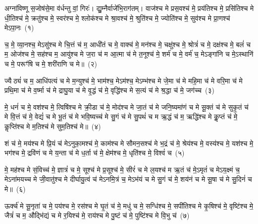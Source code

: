 
{\anuvakamend[{घा॒सिं कश॑या तपद्र॒यिं नव॑ च}]}%

\setcounter{anuvakam}{0}
अग्ना॑विष्णू स॒जोष॑से॒मा व॑र्धन्तु वां॒ गिरः॑। द्यु॒म्नैर्वाजे॑भि॒राग॑तम्। वाज॑श्च मे प्रस॒वश्च॑ मे॒ प्रय॑तिश्च मे॒ प्रसि॑तिश्च मे धी॒तिश्च॑ मे॒ क्रतु॑श्च मे॒ स्वर॑श्च मे॒ श्लोक॑श्च मे श्रा॒वश्च॑ मे॒ श्रुति॑श्च मे॒ ज्योति॑श्च मे॒ सुव॑श्च मे प्रा॒णश्च॑ मे\-ऽपा॒नः~(१)

च॒ मे॒ व्या॒नश्च॒ मे\-ऽसु॑श्च मे चि॒त्तं च॑ म॒ आधी॑तं च मे॒ वाक्च॑ मे॒ मन॑श्च मे॒ चक्षु॑श्च मे॒ श्रोत्रं॑ च मे॒ दक्ष॑श्च मे॒ बलं॑ च म॒ ओज॑श्च मे॒ सह॑श्च म॒ आयु॑श्च मे ज॒रा च॑ म आ॒त्मा च॑ मे त॒नूश्च॑ मे॒ शर्म॑ च मे॒ वर्म॑ च॒ मे\-ऽङ्गा॑नि च मे॒\-ऽस्थानि॑ च मे॒ परूꣳ॑षि च मे॒ शरी॑राणि च मे॥~(२)

{\anuvakamend[{अ॒पा॒नस्त॒नूश्च॑ मे॒\-ऽष्टाद॑श च}]}%

ज्यैठ्यं॑ च म॒ आधि॑पत्यं च मे म॒न्युश्च॑ मे॒ भाम॑श्च॒ मे\-ऽम॑श्च॒ मे\-ऽम्भ॑श्च मे जे॒मा च॑ मे महि॒मा च॑ मे वरि॒मा च॑ मे प्रथि॒मा च॑ मे व॒र्ष्मा च॑ मे द्राघु॒या च॑ मे वृ॒द्धं च॑ मे॒ वृद्धि॑श्च मे स॒त्यं च॑ मे श्र॒द्धा च॑ मे॒ जग॑च्च~(३)

मे॒ धनं॑ च मे॒ वश॑श्च मे॒ त्विषि॑श्च मे क्री॒डा च॑ मे॒ मोद॑श्च मे जा॒तं च॑ मे जनि॒ष्यमा॑णं च मे सू॒क्तं च॑ मे सुकृ॒तं च॑ मे वि॒त्तं च॑ मे॒ वेद्यं॑ च मे भू॒तं च॑ मे भवि॒ष्यच्च॑ मे सु॒गं च॑ मे सु॒पथं॑ च म ऋ॒द्धं च॑ म॒ ऋद्धि॑श्च मे कॢ॒प्तं च॑ मे॒ कॢप्ति॑श्च मे म॒तिश्च॑ मे सुम॒तिश्च॑ मे॥~(४)

{\anuvakamend[{जग॒च्चर्द्धि॒श्चतु॑र्दश च}]}%

शं च॑ मे॒ मय॑श्च मे प्रि॒यं च॑ मे\-ऽनुका॒मश्च॑ मे॒ काम॑श्च मे सौमन॒सश्च॑ मे भ॒द्रं च॑ मे॒ श्रेय॑श्च मे॒ वस्य॑श्च मे॒ यश॑श्च मे॒ भग॑श्च मे॒ द्रवि॑णं च मे य॒न्ता च॑ मे ध॒र्ता च॑ मे॒ क्षेम॑श्च मे॒ धृति॑श्च मे॒ विश्वं॑ च~(५)

मे॒ मह॑श्च मे सं॒विच्च॑ मे॒ ज्ञात्रं॑ च मे॒ सूश्च॑ मे प्र॒सूश्च॑ मे॒ सीरं॑ च मे ल॒यश्च॑ म ऋ॒तं च॑ मे॒\-ऽमृतं॑ च मे\-ऽय॒क्ष्मं च॒ मे\-ऽना॑मयच्च मे जी॒वातु॑श्च मे दीर्घायु॒त्वं च॑ मे\-ऽनमि॒त्रं च॒ मे\-ऽभ॑यं च मे सु॒गं च॑ मे॒ शय॑नं च मे सू॒षा च॑ मे सु॒दिनं॑ च मे॥~(६)

{\anuvakamend[{विश्वं॑ च॒ शय॑नम॒ष्टौ च॑}]}%

ऊर्क्च॑ मे सू॒नृता॑ च मे॒ पय॑श्च मे॒ रस॑श्च मे घृ॒तं च॑ मे॒ मधु॑ च मे॒ सग्धि॑श्च मे॒ सपी॑तिश्च मे कृ॒षिश्च॑ मे॒ वृष्टि॑श्च मे॒ जैत्रं॑ च म॒ औद्भि॑द्यं च मे र॒यिश्च॑ मे॒ राय॑श्च मे पु॒ष्टं च॑ मे॒ पुष्टि॑श्च मे वि॒भु च॑~(७)


